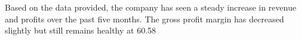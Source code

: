 

Based on the data provided, the company has seen a steady increase in revenue and profits over the past five months. The gross profit margin has decreased slightly but still remains healthy at 60.58%